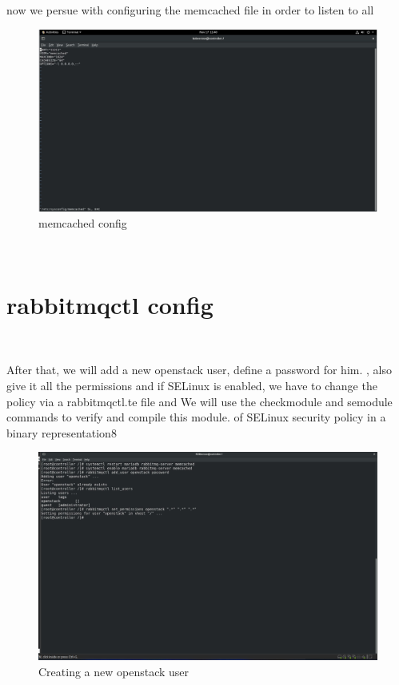 \begin{spacing}{1.2}
\par now we persue with configuring the memcached file in order to listen to all
\\
\begin{figure}[!htb] 
\begin{center} 
\includegraphics[width=1\linewidth]{Cloud/Pre-Requirements/memcached config} 
\end{center} 
\caption{memcached config} 
\end{figure}  \FloatBarrier
\\
\section{rabbitmqctl config }
\\
\par After that, we will add a new openstack user, define a password for him.
, also give it all the permissions and if SELinux is enabled, we have to change the policy
via a rabbitmqctl.te file and We will use the checkmodule and semodule commands to verify and compile this module.
of SELinux security policy in a binary representation8 
\\
\begin{figure}[!htb] 
\begin{center} 
\includegraphics[width=1\linewidth]{Cloud/Pre-Requirements/Creating a new openstack user} 
\end{center} 
\caption{Creating a new openstack user} 
\end{figure}  \FloatBarrier
\\



\end{spacing}
